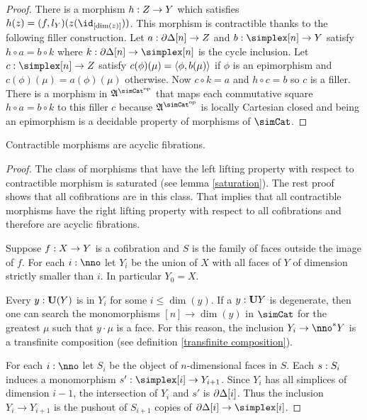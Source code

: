 \documentclass[csh.tex]{subfiles}
\begin{document}
\begin{proof}
There is a morphism $h: Z\to Y$ which satisfies $h(z) = (f,l_Y)(z(\id_{[\dim(z)]}))$. This morphism is contractible thanks to the following filler construction. Let $a: \partial\Delta[n]\to Z$ and $b\of \simplex[n]\to Y$ satisfy $h\circ a = b\circ k$ where $k\of\cycle[n]\to\simplex[n]$ is the cycle inclusion. Let $c\of \simplex[n]\to Z$ satisfy $c(\phi)(\mu) = \left\langle \phi,b(\mu) \right\rangle$ if $\phi$ is an epimorphism and $c(\phi)(\mu) = a(\phi)(\mu)$ otherwise. Now $c\circ k = a$ and $h\circ c = b$ so $c$ is a filler. There is a morphism in $\ambient\s$ that maps each commutative square $h\circ a = b\circ k$ to this filler $c$ because $\ambient\s$ is locally Cartesian closed and being an epimorphism is a decidable property of morphisms of $\simCat$.
\end{proof}

\begin{lemma} Contractible morphisms are acyclic fibrations.\label{Reedy}\end{lemma}

\begin{proof} The class of morphisms that have the left lifting property with respect to contractible morphism is saturated (see lemma \ref{saturation}). The rest proof shows that all cofibrations are in this class. That implies that all contractible morphisms have the right lifting property with respect to all cofibrations and therefore are acyclic fibrations.

Suppose $f: X\to Y$ is a cofibration and $S$ is the family of faces outside the image of $f$. For each $i\of\nno$ let $Y_i$ be the union of $X$ with all faces of $Y$ of dimension strictly smaller than $i$. In particular $Y_0=X$.

Every $y:\mathbf{U}(Y)$ is in $Y_i$ for some $i\leq \dim(y)$. If a $y:\mathbf{U} Y$ is degenerate, then one can search the monomorphisms $[n]\to\dim(y)$ in $\simCat$ for the greatest $\mu$ such that $y\cdot\mu$ is a face. For this reason, the inclusion $Y_i\to\nno\ri Y$ is a transfinite composition (see definition \ref{transfinite composition}).

For each $i\of\nno$ let $S_i$ be the object of $n$-dimensional faces in $S$. Each $s: S_i$ induces a monomorphism $s'\of\simplex[i]\to Y_{i+1}$. Since $Y_{i}$ has all simplices of dimension $i-1$, the intersection of $Y_i$ and $s'$ is $\partial\Delta[i]$. Thus the inclusion $Y_i\to Y_{i+1}$ is the pushout of $S_{i+1}$ copies of $\cycle[i]\to\simplex[i]$.
\end{proof}
\end{document}
